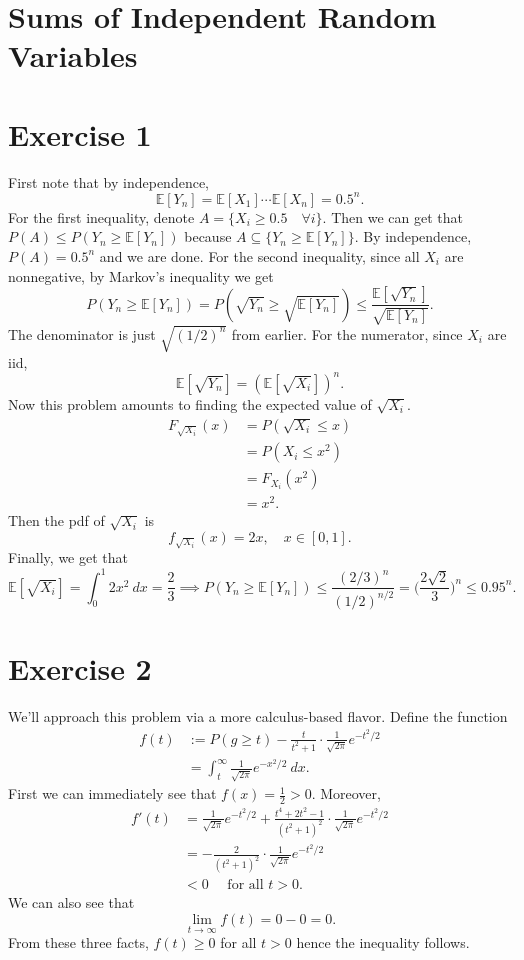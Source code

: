\section{Sums of Independent Random Variables}

\section*{Exercise 1}
First note that by independence, 
\[ \mathbb{E}[Y_n] = \mathbb{E}[X_1] \cdots \mathbb{E}[X_n] = 0.5^n. \]
For the first inequality, denote $A = \{X_i \geq 0.5 \quad \forall i\}$. Then we can get that 
$P(A) \leq P(Y_n \geq \mathbb{E}[Y_n])$ because $A \subseteq \{Y_n  \geq \mathbb{E}[Y_n]\}$. By independence, 
$P(A) = 0.5^n$ and we are done. For the second inequality, since all $X_i$ are nonnegative, 
by Markov's inequality we get 
\[ P(Y_n \geq \mathbb{E}[Y_n]) = P(\sqrt{Y_n} \geq \sqrt{\mathbb{E}[Y_n]}) 
\leq \frac{\mathbb{E}[\sqrt{Y_n}]}{\sqrt{\mathbb{E}[Y_n]}}. \]
The denominator is just $\sqrt{(1/2)^n}$ from earlier. For the numerator, since $X_i$ are iid, 
\[ \mathbb{E}[\sqrt{Y_n}] = (\mathbb{E}[\sqrt{X_i}])^n. \]
Now this problem amounts to finding the expected value of $\sqrt{X_i}$.
\begin{align*}
	F_{\sqrt{X_i}}(x) 
	&= P(\sqrt{X_i} \leq x) \\
	&= P(X_i \leq x^2) \\
	&= F_{X_i}(x^2) \\
	&= x^2.
\end{align*}
Then the pdf of $\sqrt{X_i}$ is 
\[ f_{\sqrt{X_i}}(x) = 2x, \quad x \in [0, 1]. \]
Finally, we get that 
\[ \mathbb{E}[\sqrt{X_i}] = \int_{0}^{1} 2x^2 \ dx = \frac{2}{3} 
\implies P(Y_n \geq \mathbb{E}[Y_n]) \leq \frac{(2/3)^n}{(1/2)^{n/2}} 
= \biggl( \frac{2 \sqrt{2}}{3} \biggr)^n \leq 0.95^n. \]


\newpage
\section*{Exercise 2}
We'll approach this problem via a more calculus-based flavor.
Define the function 
\begin{align*}
	f(t) 
	&:= P(g \geq t) - \frac{t}{t^2 + 1} \cdot \frac{1}{\sqrt{2 \pi}} e^{-t^2 / 2} \\
	&= \int_{t}^{\infty} \frac{1}{\sqrt{2 \pi}} e^{-x^2 / 2} \ dx.
\end{align*}
First we can immediately see that $f(x) = \frac{1}{2} > 0$. Moreover, 
\begin{align*}
	f'(t) 
	&= \frac{1}{\sqrt{2 \pi}}e^{-t^2 / 2} + \frac{t^4 + 2t^2 - 1}{(t^2 + 1)^2} 
	\cdot \frac{1}{\sqrt{2 \pi}} e^{-t^2 / 2} \\
	&= -\frac{2}{(t^2 + 1)^2} \cdot \frac{1}{\sqrt{2 \pi}} e^{-t^2 / 2} \\
	&< 0 \quad \text{ for all } t > 0.
\end{align*}
We can also see that 
\[ \lim_{t \to \infty} f(t) = 0 - 0 = 0. \]
From these three facts, $f(t) \geq 0$ for all $t > 0$ hence the inequality follows.


